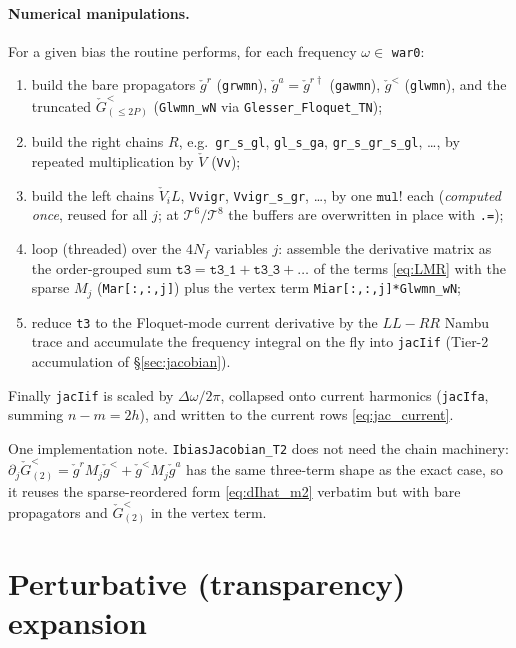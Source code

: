 \documentclass[11pt,a4paper]{article}
\begin{document}
\paragraph{Numerical manipulations.}
For a given bias the routine performs, for each frequency $\omega\in$
\texttt{war0}:
\begin{enumerate}
  \item build the bare propagators $\check g^r$ (\texttt{grwmn}),
        $\check g^a=\check g^{r\dagger}$ (\texttt{gawmn}), $\check g^<$
        (\texttt{glwmn}), and the truncated $\check G^<_{(\le2P)}$
        (\texttt{Glwmn\_wN} via \texttt{Glesser\_Floquet\_TN});
  \item build the right chains $R$, e.g.\ \texttt{gr\_s\_gl}, \texttt{gl\_s\_ga},
        \texttt{gr\_s\_gr\_s\_gl}, \dots, by repeated multiplication by
        $\check V$ (\texttt{Vv});
  \item build the left chains $\check V_i L$, \texttt{Vvigr},
        \texttt{Vvigr\_s\_gr}, \dots, by one $\texttt{mul!}$ each
        (\emph{computed once}, reused for all $j$; at $\mathcal T^6/\mathcal T^8$
        the buffers are overwritten in place with \verb|.=|);
  \item loop (threaded) over the $4N_f$ variables $j$: assemble the derivative
        matrix as the order-grouped sum
        $\texttt{t3}=\texttt{t3\_1}+\texttt{t3\_3}+\dots$ of the terms
        \eqref{eq:LMR} with the sparse $M_j$ (\texttt{Mar[:,:,j]}) plus the vertex
        term \texttt{Miar[:,:,j]*Glwmn\_wN};
  \item reduce \texttt{t3} to the Floquet-mode current derivative by the
        $LL\!-\!RR$ Nambu trace and accumulate the frequency integral on the fly
        into \texttt{jacIif} (Tier-2 accumulation of \S\ref{sec:jacobian}).
\end{enumerate}
Finally \texttt{jacIif} is scaled by $\Delta\omega/2\pi$, collapsed onto current
harmonics (\texttt{jacIfa}, summing $n-m=2h$), and written to the current rows
\eqref{eq:jac_current}.

One implementation note. \texttt{IbiasJacobian\_T2} does not need the chain
machinery: $\partial_j\check G^<_{(2)}=\check g^r M_j\check g^<+\check g^< M_j\check
g^a$ has the same three-term shape as the exact case, so it reuses the
sparse-reordered form \eqref{eq:dIhat_m2} verbatim but with bare propagators and
$\check G^<_{(2)}$ in the vertex term.  

\section{Perturbative (transparency) expansion}
\label{sec:perturbation}
\end{document}
